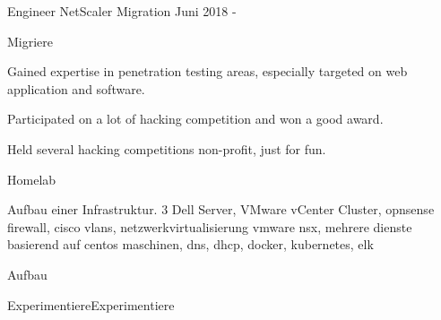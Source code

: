 


\begin{cventries}


\cventry
{Engineer} %
{NetScaler Migration} %
{} %
{Juni 2018 -} %
{ %
\begin{cvitems}
\item {Migriere }
\item {Gained expertise in penetration testing areas, especially targeted on web application and software.}
\item {Participated on a lot of hacking competition and won a good award.}
\item {Held several hacking competitions non-profit, just for fun.}
\end{cvitems}
}


\cventry
{} %
{Homelab} %
{} %
{} %
{ %
\begin{cvitems}
\item {Aufbau einer Infrastruktur. 3 Dell Server, VMware vCenter Cluster, opnsense firewall, cisco vlans, netzwerkvirtualisierung vmware nsx, mehrere dienste basierend auf centos maschinen, dns, dhcp, docker, kubernetes, elk}
\item {Aufbau }
\item {ExperimentiereExperimentiere  }
\end{cvitems}
}


\end{cventries}
